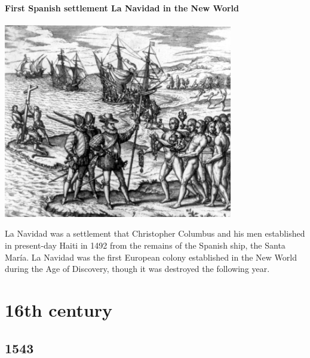 \documentclass[11pt]{report}
\begin{document}
\subsection{First Spanish settlement La Navidad in the New World}
\vspace{2mm}\begin{center}\includegraphics[width=10cm]{./img/lanavidad.jpg}\end{center}
La Navidad was a settlement that Christopher Columbus and his men established in present-day Haiti in 1492 from the remains of the Spanish ship, the Santa María. La Navidad was the first European colony established in the New World during the Age of Discovery, though it was destroyed the following year.

								
\part{16th century}
\chapter{1543}
\section{}
\end{document}
